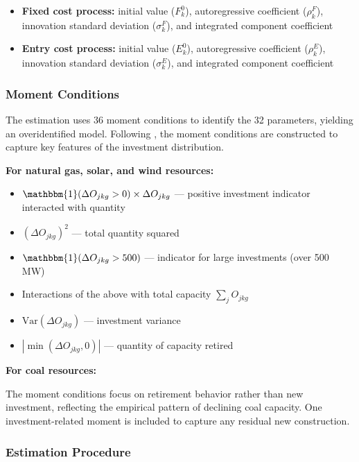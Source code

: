 \documentclass[12pt]{article}
\begin{document}
\begin{itemize}
    \item \textbf{Fixed cost process:} initial value ($F_k^0$), autoregressive coefficient ($\rho_k^F$), innovation standard deviation ($\sigma_k^F$), and integrated component coefficient
    \item \textbf{Entry cost process:} initial value ($E_k^0$), autoregressive coefficient ($\rho_k^E$), innovation standard deviation ($\sigma_k^E$), and integrated component coefficient
\end{itemize}

\subsubsection{Moment Conditions}\label{subsec:moments}

The estimation uses 36 moment conditions to identify the 32 parameters, yielding an overidentified model. Following \cite{gowrisankaran2024energy}, the moment conditions are constructed to capture key features of the investment distribution.

\vspace{1em}
\noindent\textbf{For natural gas, solar, and wind resources:}
\begin{itemize}
    \item $\mathbbm{1}(\Delta O_{jkg} > 0) \times \Delta O_{jkg}$ — positive investment indicator interacted with quantity
    \item $(\Delta O_{jkg})^2$ — total quantity squared
    \item $\mathbbm{1}(\Delta O_{jkg} > 500)$ — indicator for large investments (over 500 MW)
    \item Interactions of the above with total capacity $\sum_j O_{jkg}$
    \item $\text{Var}(\Delta O_{jkg})$ — investment variance
    \item $|\min(\Delta O_{jkg}, 0)|$ — quantity of capacity retired
\end{itemize}

\vspace{1em}
\noindent\textbf{For coal resources:}

The moment conditions focus on retirement behavior rather than new investment, reflecting the empirical pattern of declining coal capacity. One investment-related moment is included to capture any residual new construction.

\subsubsection{Estimation Procedure}\label{subsec:estimation_procedure}
\end{document}
